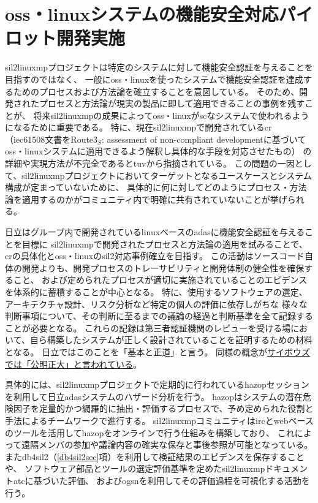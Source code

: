 \section{\acrshort{oss}・\acrshort{linux}システムの機能安全対応パイロット開発実施}
\acrshort{sil2linuxmp}プロジェクトは特定のシステムに対して機能安全認証を与えることを目指すのではなく、
一般に\acrshort{oss}・\acrshort{linux}を使ったシステムで機能安全認証を達成するためのプロセスおよび方法論を確立することを意図している。
そのため、開発されたプロセスと方法論が現実の製品に即して適用できることの事例を残すことが、
将来\acrshort{sil2linuxmp}の成果によって\acrshort{oss}・\acrshort{linux}が\acrshort{sc}なシステムで使われるようになるために重要である。
特に、現在\acrshort{sil2linuxmp}で開発されている\acrshort{cr}
（\acrshort{iec61508}文書をRoute$3_S$: assessment of non-compliant developmentに基づいて
\acrshort{oss}・\acrshort{linux}システムに適用できるよう解釈し具体的な手段を対応させたもの）
の詳細や実現方法が不完全であると\acrshort{tuv}から指摘されている。
この問題の一因として、\acrshort{sil2linuxmp}プロジェクトにおいてターゲットとなるユースケースとシステム構成が定まっていないために、
具体的に何に対してどのようにプロセス・方法論を適用するのかがコミュニティ内で明確に共有されていないことが挙げられる。
\par
日立はグループ内で開発されている\acrshort{linux}ベースの\gls{adas}に機能安全認証を与えることを目標に
\acrshort{sil2linuxmp}で開発されたプロセスと方法論の適用を試みることで、
\acrshort{cr}の具体化と\acrshort{oss}・\acrshort{linux}の\acrshort{sil2}対応事例確立を目指す。
この活動はソースコード自体の開発よりも、開発プロセスのトレーサビリティと開発体制の健全性を確保すること、
および定められたプロセスが適切に実施されていることのエビデンスを体系的に蓄積することが中心となる。
特に、使用するソフトウェアの選定、アーキテクチャ設計、リスク分析など特定の個人の評価に依存しがちな
様々な判断事項について、その判断に至るまでの議論の経過と判断基準を全て記録することが必要となる。
これらの記録は第三者認証機関のレビューを受ける場において、自ら構築したシステムが正しく設計されていることを証明するための材料となる。
日立ではこのことを「基本と正道」と言う。
同様の概念が\href{http://www.slideshare.net/chika_nakazawa/ss-27726686}{サイボウズでは「公明正大」と言われている}。 \cite{cybozu}
\par
具体的には、\acrshort{sil2linuxmp}プロジェクトで定期的に行われている\gls{hazop}セッションを利用して日立\acrshort{adas}システムのハザード分析を行う。
\acrshort{hazop}はシステムの潜在危険因子を定量的かつ網羅的に抽出・評価するプロセスで、予め定められた役割と手法によるチームワークで進行する。
\acrshort{sil2linuxmp}コミュニティは\acrshort{irc}とwebベースのツールを活用して\acrshort{hazop}をオンラインで行う仕組みを構築しており、
これによって遠隔メンバの参加や議論内容の確実な保存と事後参照が可能となっている。
また\acrshort{db4sil2}（\ref{db4sil2sec}項）を利用して検証結果のエビデンスを保存することや、
ソフトウェア部品とツールの選定評価基準を定めた\acrshort{sil2linuxmp}ドキュメント\gls{atc}に基づいた評価、
および\acrshort{ogsn}を利用してその評価過程を可視化する活動を行う。
